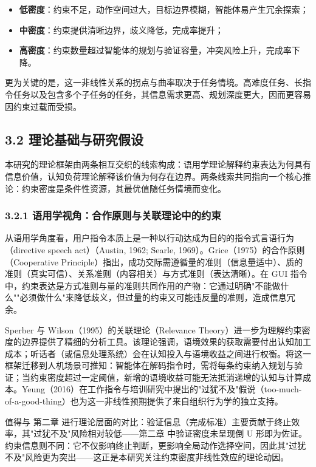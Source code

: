\documentclass[12pt,a4paper,openany,oneside]{ctexrep}
\begin{document}
\begin{itemize}
\item \textbf{低密度}：约束不足，动作空间过大，目标边界模糊，智能体易产生冗余探索；
\item \textbf{中密度}：约束提供清晰边界，歧义降低，完成率提升；
\item \textbf{高密度}：约束数量超过智能体的规划与验证容量，冲突风险上升，完成率下降。
\end{itemize}


更为关键的是，这一非线性关系的拐点与曲率取决于任务情境。高难度任务、长指令任务以及包含多个子任务的任务，其信息需求更高、规划深度更大，因而更容易因约束过载而受损。

\subsection{3.2 理论基础与研究假设}


本研究的理论框架由两条相互交织的线索构成：语用学理论解释约束表达为何具有信息价值，认知负荷理论解释该价值为何存在边界。两条线索共同指向一个核心推论：约束密度是条件性资源，其最优值随任务情境而变化。

\subsubsection{3.2.1 语用学视角：合作原则与关联理论中的约束}


从语用学角度看，用户指令本质上是一种以行动达成为目的的指令式言语行为（directive speech act）（Austin, 1962; Searle, 1969）。Grice（1975）的合作原则（Cooperative Principle）指出，成功交际需遵循量的准则（信息量适中）、质的准则（真实可信）、关系准则（内容相关）与方式准则（表达清晰）。在 GUI 指令中，约束表达是方式准则与量的准则共同作用的产物：它通过明确"不能做什么""必须做什么"来降低歧义，但过量的约束又可能违反量的准则，造成信息冗余。

Sperber 与 Wilson（1995）的关联理论（Relevance Theory）进一步为理解约束密度的边界提供了精细的分析工具。该理论强调，语境效果的获取需要付出认知加工成本；听话者（或信息处理系统）会在认知投入与语境收益之间进行权衡。将这一框架迁移到人机场景可推知：智能体在解码指令时，需将每条约束纳入规划与验证；当约束密度超过一定阈值，新增的语境收益可能无法抵消递增的认知与计算成本。Yeung（2016）在工作指令与培训研究中提出的"过犹不及"假说（too-much-of-a-good-thing）也为这一非线性预期提供了来自组织行为学的独立支持。

值得与 第二章 进行理论层面的对比：验证信息（完成标准）主要贡献于终止效率，其"过犹不及"风险相对较低——第二章 中验证密度未呈现倒 U 形即为佐证。约束信息则不同：它不仅影响终止判断，更影响全局动作选择空间，因此其"过犹不及"风险更为突出——这正是本研究关注约束密度非线性效应的理论动因。
\end{document}
